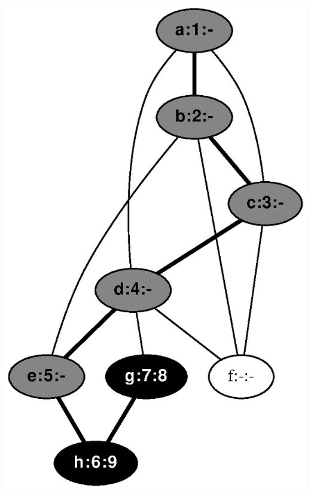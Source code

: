 \documentclass{article}
\begin{document}
\includegraphics[height=.3\textheight]{dfs_undirected_classroom_09.eps}
\vspace{1em}
\end{document}
